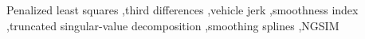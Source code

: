 \documentclass[a4paper,fleqn]{cas-dc}
\begin{document}
\begin{keywords}
Penalized least squares \sep third differences \sep vehicle jerk \sep smoothness index \sep truncated singular-value decomposition \sep smoothing splines \sep NGSIM
\end{keywords}
\maketitle








\end{document}
